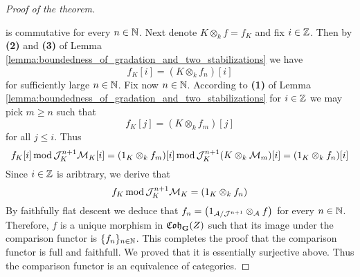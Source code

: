 \begin{proof}[Proof of the theorem]
\begin{center}
\end{center}
is commutative for every $n\in {\mathbb N}$. Next denote $K\otimes_k f = f_K$ and fix $i\in {\mathbb Z}$. Then by \textbf{(2)} and \textbf{(3)} of Lemma \ref{lemma:boundedness_of_gradation_and_two_stabilizations} we have
$$f_K[i] = (K\otimes_kf_n)[i]$$
for sufficiently large $n\in {\mathbb N}$. Fix now $n\in {\mathbb N}$. According to \textbf{(1)} of Lemma \ref{lemma:boundedness_of_gradation_and_two_stabilizations} for $i\in {\mathbb Z}$ we may pick $m\geq n$ such that
$$f_K[j] = (K\otimes_kf_m)[j]$$
for all $j \leq i$. Thus
$$f_K[i]\,\mathrm{mod}\,{\mathcal J}_K^{n+1}{\mathcal M}_K[i] = (1_K\otimes_kf_m)[i]\,\mathrm{mod}\,{\mathcal J}_K^{n+1}(K\otimes_k{\mathcal M}_m)[i] = (1_K\otimes_kf_n)[i]$$
Since $i\in {\mathbb Z}$ is aribtrary, we derive that
$$f_K\,\mathrm{mod}\,{\mathcal J}_K^{n+1}{\mathcal M}_K = (1_K\otimes_kf_n)$$
By faithfully flat descent we deduce that $f_n = \left(1_{{\mathcal A}/{\mathcal J}^{n+1}}\otimes_{{\mathcal A}}f\right)$ for every $n\in {\mathbb N}$. Therefore,  $f$ is a unique morphism in $\mathfrak{Coh}_{\mathbf{G}}(Z)$ such that its image under the comparison functor is $\{f_n\}_{n\in {\mathbb N}}$. This completes the proof that the comparison functor is full and faithfull. We proved that it is essentially surjective above. Thus the comparison functor is an equivalence of categories.
\end{proof}




\small




